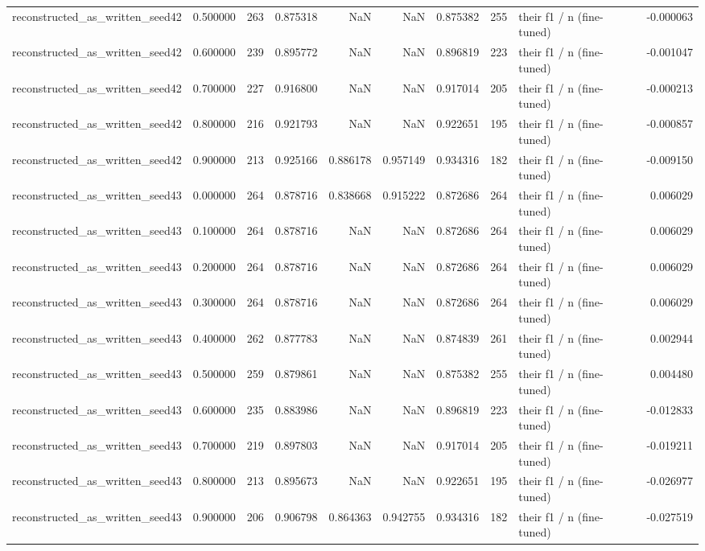 \begin{tabular}{lrrrrrrrlr}
reconstructed_as_written_seed42 & 0.500000 & 263 & 0.875318 & NaN & NaN & 0.875382 & 255 & their f1 / n (fine-tuned) & -0.000063 \\
reconstructed_as_written_seed42 & 0.600000 & 239 & 0.895772 & NaN & NaN & 0.896819 & 223 & their f1 / n (fine-tuned) & -0.001047 \\
reconstructed_as_written_seed42 & 0.700000 & 227 & 0.916800 & NaN & NaN & 0.917014 & 205 & their f1 / n (fine-tuned) & -0.000213 \\
reconstructed_as_written_seed42 & 0.800000 & 216 & 0.921793 & NaN & NaN & 0.922651 & 195 & their f1 / n (fine-tuned) & -0.000857 \\
reconstructed_as_written_seed42 & 0.900000 & 213 & 0.925166 & 0.886178 & 0.957149 & 0.934316 & 182 & their f1 / n (fine-tuned) & -0.009150 \\
reconstructed_as_written_seed43 & 0.000000 & 264 & 0.878716 & 0.838668 & 0.915222 & 0.872686 & 264 & their f1 / n (fine-tuned) & 0.006029 \\
reconstructed_as_written_seed43 & 0.100000 & 264 & 0.878716 & NaN & NaN & 0.872686 & 264 & their f1 / n (fine-tuned) & 0.006029 \\
reconstructed_as_written_seed43 & 0.200000 & 264 & 0.878716 & NaN & NaN & 0.872686 & 264 & their f1 / n (fine-tuned) & 0.006029 \\
reconstructed_as_written_seed43 & 0.300000 & 264 & 0.878716 & NaN & NaN & 0.872686 & 264 & their f1 / n (fine-tuned) & 0.006029 \\
reconstructed_as_written_seed43 & 0.400000 & 262 & 0.877783 & NaN & NaN & 0.874839 & 261 & their f1 / n (fine-tuned) & 0.002944 \\
reconstructed_as_written_seed43 & 0.500000 & 259 & 0.879861 & NaN & NaN & 0.875382 & 255 & their f1 / n (fine-tuned) & 0.004480 \\
reconstructed_as_written_seed43 & 0.600000 & 235 & 0.883986 & NaN & NaN & 0.896819 & 223 & their f1 / n (fine-tuned) & -0.012833 \\
reconstructed_as_written_seed43 & 0.700000 & 219 & 0.897803 & NaN & NaN & 0.917014 & 205 & their f1 / n (fine-tuned) & -0.019211 \\
reconstructed_as_written_seed43 & 0.800000 & 213 & 0.895673 & NaN & NaN & 0.922651 & 195 & their f1 / n (fine-tuned) & -0.026977 \\
reconstructed_as_written_seed43 & 0.900000 & 206 & 0.906798 & 0.864363 & 0.942755 & 0.934316 & 182 & their f1 / n (fine-tuned) & -0.027519 \\

\end{tabular}

